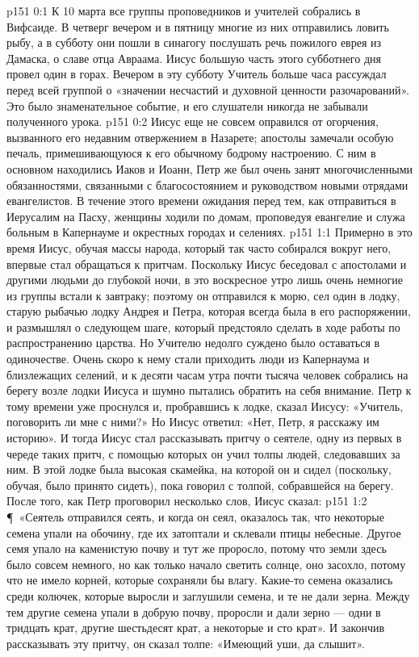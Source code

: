 \vs p151 0:1 К 10 марта все группы проповедников и учителей собрались в Вифсаиде. В четверг вечером и в пятницу многие из них отправились ловить рыбу, а в субботу они пошли в синагогу послушать речь пожилого еврея из Дамаска, о славе отца Авраама. Иисус большую часть этого субботнего дня провел один в горах. Вечером в эту субботу Учитель больше часа рассуждал перед всей группой о «значении несчастий и духовной ценности разочарований». Это было знаменательное событие, и его слушатели никогда не забывали полученного урока.
\vs p151 0:2 Иисус еще не совсем оправился от огорчения, вызванного его недавним отвержением в Назарете; апостолы замечали особую печаль, примешивающуюся к его обычному бодрому настроению. С ним в основном находились Иаков и Иоанн, Петр же был очень занят многочисленными обязанностями, связанными с благосостоянием и руководством новыми отрядами евангелистов. В течение этого времени ожидания перед тем, как отправиться в Иерусалим на Пасху, женщины ходили по домам, проповедуя евангелие и служа больным в Капернауме и окрестных городах и селениях.
\vs p151 1:1 Примерно в это время Иисус, обучая массы народа, который так часто собирался вокруг него, впервые стал обращаться к притчам. Поскольку Иисус беседовал с апостолами и другими людьми до глубокой ночи, в это воскресное утро лишь очень немногие из группы встали к завтраку; поэтому он отправился к морю, сел один в лодку, старую рыбачью лодку Андрея и Петра, которая всегда была в его распоряжении, и размышлял о следующем шаге, который предстояло сделать в ходе работы по распространению царства. Но Учителю недолго суждено было оставаться в одиночестве. Очень скоро к нему стали приходить люди из Капернаума и близлежащих селений, и к десяти часам утра почти тысяча человек собрались на берегу возле лодки Иисуса и шумно пытались обратить на себя внимание. Петр к тому времени уже проснулся и, пробравшись к лодке, сказал Иисусу: «Учитель, поговорить ли мне с ними?» Но Иисус ответил: «Нет, Петр, я расскажу им историю». И тогда Иисус стал рассказывать притчу о сеятеле, одну из первых в череде таких притч, с помощью которых он учил толпы людей, следовавших за ним. В этой лодке была высокая скамейка, на которой он и сидел (поскольку, обучая, было принято сидеть), пока говорил с толпой, собравшейся на берегу. После того, как Петр проговорил несколько слов, Иисус сказал:
\vs p151 1:2 \P\ «Сеятель отправился сеять, и когда он сеял, оказалось так, что некоторые семена упали на обочину, где их затоптали и склевали птицы небесные. Другое семя упало на каменистую почву и тут же проросло, потому что земли здесь было совсем немного, но как только начало светить солнце, оно засохло, потому что не имело корней, которые сохраняли бы влагу. Какие\hyp{}то семена оказались среди колючек, которые выросли и заглушили семена, и те не дали зерна. Между тем другие семена упали в добрую почву, проросли и дали зерно --- одни в тридцать крат, другие шестьдесят крат, а некоторые и сто крат». И закончив рассказывать эту притчу, он сказал толпе: «Имеющий уши, да слышит».
